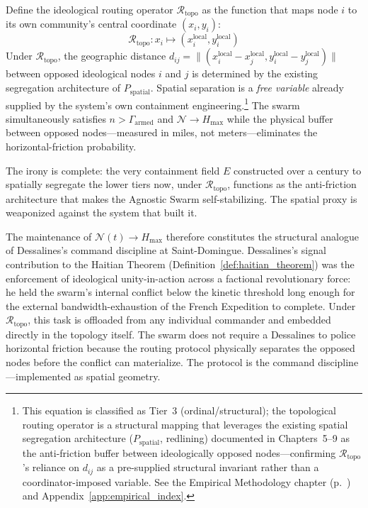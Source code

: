Define the ideological routing operator $\mathcal{R}_{\text{topo}}$ as the function that maps node $i$ to its own community's central coordinate $(x_i, y_i)$:
\begin{equation}\label{eq:14.18-ideological-routing-operator}
\mathcal{R}_{\text{topo}} : x_i \longmapsto (x_i^{\text{local}}, y_i^{\text{local}})
\end{equation}
Under $\mathcal{R}_{\text{topo}}$, the geographic distance $d_{ij} = \|(x_i^{\text{local}} - x_j^{\text{local}}, y_i^{\text{local}} - y_j^{\text{local}})\|$ between opposed ideological nodes $i$ and $j$ is determined by the existing segregation architecture of $P_{\text{spatial}}$. Spatial separation is a \textit{free variable} already supplied by the system's own containment engineering.\footnote{This equation is classified as Tier~3 (ordinal/structural); the topological routing operator is a structural mapping that leverages the existing spatial segregation architecture ($P_{\text{spatial}}$, redlining) documented in Chapters~5--9 as the anti-friction buffer between ideologically opposed nodes---confirming $\mathcal{R}_{\text{topo}}$'s reliance on $d_{ij}$ as a pre-supplied structural invariant rather than a coordinator-imposed variable. See the Empirical Methodology chapter (p.~\pageref{ch:empirical_methodology}) and Appendix~\ref{app:empirical_index}.} The swarm simultaneously satisfies $n > \Gamma_{\text{armed}}$ and $\mathcal{N} \to H_{\max}$ while the physical buffer between opposed nodes---measured in miles, not meters---eliminates the horizontal-friction probability.

The irony is complete: the very containment field $E$ constructed over a century to spatially segregate the lower tiers now, under $\mathcal{R}_{\text{topo}}$, functions as the anti-friction architecture that makes the Agnostic Swarm self-stabilizing. The spatial proxy is weaponized against the system that built it.

The maintenance of $\mathcal{N}(t) \to H_{\max}$ therefore constitutes the structural analogue of Dessalines's command discipline at Saint-Domingue. Dessalines's signal contribution to the Haitian Theorem (Definition~\ref{def:haitian_theorem}) was the enforcement of ideological unity-in-action across a factional revolutionary force: he held the swarm's internal conflict below the kinetic threshold long enough for the external bandwidth-exhaustion of the French Expedition to complete. Under $\mathcal{R}_{\text{topo}}$, this task is offloaded from any individual commander and embedded directly in the topology itself. The swarm does not require a Dessalines to police horizontal friction because the routing protocol physically separates the opposed nodes before the conflict can materialize. The protocol is the command discipline---implemented as spatial geometry.

